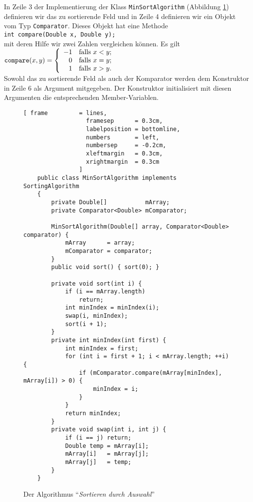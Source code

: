 In Zeile 3 der Implementierung der Klass \texttt{MinSortAlgorithm} (Abbildung
\ref{fig:MinSortAlgorithm.java})
 definieren wir das zu sortierende Feld und in Zeile 4 definieren wir ein Objekt
vom Typ \texttt{Comparator}.  Dieses Objekt hat eine Methode \\[0.2cm]
\hspace*{1.3cm} \texttt{int compare(Double x, Double y);}\\[0.2cm]
mit deren Hilfe wir zwei Zahlen vergleichen k\"onnen.  Es gilt \\[0.2cm]
\hspace*{1.3cm} 
$\mathtt{compare}(x,y) = \left\{
 \begin{array}[c]{rl}
  -1 & \mbox{falls $x < y$;} \\ 
   0 & \mbox{falls $x = y$;} \\ 
   1 & \mbox{falls $x > y$.} \\ 
 \end{array}\right.
$ %
\\[0.2cm]
Sowohl das zu sortierende Feld als auch der Komparator werden dem Konstruktor in Zeile 
6 als Argument mitgegeben.  Der Konstruktor initialisiert mit diesen Argumenten die
entsprechenden Member-Variablen.   

\begin{figure}[!ht]
  \centering
\begin{Verbatim}[ frame         = lines, 
                  framesep      = 0.3cm, 
                  labelposition = bottomline,
                  numbers       = left,
                  numbersep     = -0.2cm,
                  xleftmargin   = 0.3cm,
                  xrightmargin  = 0.3cm
                ]
    public class MinSortAlgorithm implements SortingAlgorithm
    {
        private Double[]           mArray;
        private Comparator<Double> mComparator;
    
        MinSortAlgorithm(Double[] array, Comparator<Double> comparator) {
            mArray      = array;
            mComparator = comparator;
        }
        public void sort() { sort(0); }
    
        private void sort(int i) {
            if (i == mArray.length)
                return;
            int minIndex = minIndex(i);
            swap(i, minIndex);
            sort(i + 1);
        }
        private int minIndex(int first) {
            int minIndex = first;
            for (int i = first + 1; i < mArray.length; ++i) {
                if (mComparator.compare(mArray[minIndex], mArray[i]) > 0) {
                    minIndex = i;
                }
            }
            return minIndex;
        }
        private void swap(int i, int j) {
            if (i == j) return;
            Double temp = mArray[i];
            mArray[i]   = mArray[j];
            mArray[j]   = temp;
        }
    }
\end{Verbatim}
\vspace*{-0.3cm}
  \caption{Der Algorithmus ``\emph{Sortieren durch Auswahl}''}
  \label{fig:MinSortAlgorithm.java}
\end{figure}

